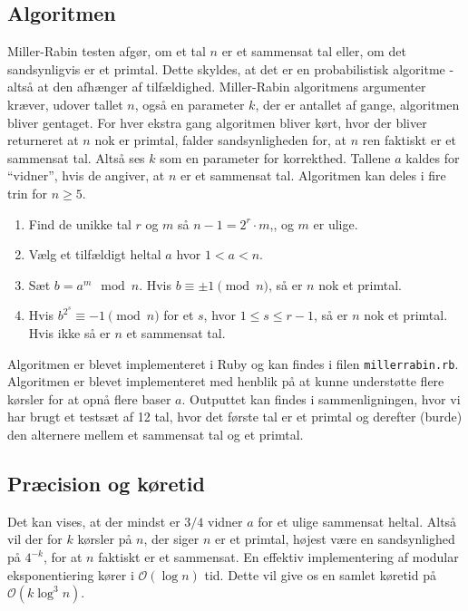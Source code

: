 \subsection{Algoritmen}
Miller-Rabin testen afgør, om et tal $n$ er et sammensat tal eller, om det sandsynligvis er et primtal.
Dette skyldes, at det er en probabilistisk algoritme - altså at den afhænger af tilfældighed.
Miller-Rabin algoritmens argumenter kræver, udover tallet $n$, også en parameter $k$, der er antallet af gange, algoritmen bliver gentaget.
For hver ekstra gang algoritmen bliver kørt, hvor der bliver returneret at $n$ nok er primtal, falder sandsynligheden for, at $n$ ren faktiskt er et sammensat tal.
Altså ses $k$ som en parameter for korrekthed. Tallene $a$ kaldes for ``vidner'', hvis de angiver, at $n$ er et sammensat tal.
Algoritmen kan deles i fire trin for $n \geq 5$.
\begin{enumerate}
  \item Find de unikke tal $r$ og $m$ så $n-1=2^r\cdot m$,, og $m$ er ulige.
  \item Vælg et tilfældigt heltal $a$ hvor $1 < a < n$.
  \item Sæt $b = a^m \mod n$. Hvis $b \equiv \pm 1 \pmod{n}$, så er $n$ nok et primtal.
  \item Hvis $b^{2^s}\equiv -1 \pmod{n}$ for et $s$, hvor $1 \leq s \leq r-1$, så er $n$ nok et primtal. Hvis ikke så er $n$ et sammensat tal.
\end{enumerate}
Algoritmen er blevet implementeret i Ruby og kan findes i filen \texttt{millerrabin.rb}.
Algoritmen er blevet implementeret med henblik på at kunne understøtte flere kørsler for at opnå flere baser $a$. Outputtet kan findes i sammenligningen, hvor vi har brugt et testsæt af 12 tal, hvor det første tal er et primtal og derefter (burde) den alternere mellem et sammensat tal og et primtal.

\subsection{Præcision og køretid}
Det kan vises, at der mindst er $3/4$ vidner $a$ for et ulige sammensat heltal. Altså vil der for $k$ kørsler på $n$, der siger $n$ er et primtal,
højest være en sandsynlighed på $4^{-k}$, for at $n$ faktiskt er et sammensat. En effektiv implementering af modular eksponentiering kører
i $\mathcal{O} (\log n)$ tid. Dette vil give os en samlet køretid på $\mathcal{O} (k\log^3 n)$.
